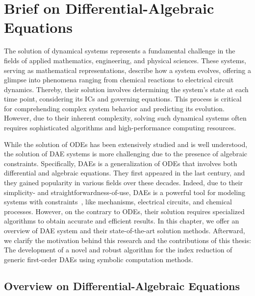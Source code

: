 
\chapter{Brief on Differential-Algebraic Equations}
\label{chap2:brief_daes}

The solution of dynamical systems represents a fundamental challenge in the fields of applied mathematics, engineering, and physical sciences. These systems, serving as mathematical representations, describe how a system evolves, offering a glimpse into phenomena ranging from chemical reactions to electrical circuit dynamics. Thereby, their solution involves determining the system's state at each time point, considering its \acp{IC} and governing equations. This process is critical for comprehending complex system behavior and predicting its evolution. However, due to their inherent complexity, solving such dynamical systems often requires sophisticated algorithms and high-performance computing resources.

While the solution of \acp{ODE} has been extensively studied and is well understood, the solution of \ac{DAE} systems is more challenging due to the presence of algebraic constraints. Specifically, \acp{DAE} is a generalization of \acp{ODE} that involves both differential and algebraic equations. They first appeared in the last century, and they gained popularity in various fields over these decades. Indeed, due to their simplicity- and straightforwardness-of-use, \acp{DAE} is a powerful tool for modeling systems with constraints~\cite{burger2018dae}, like mechanisms, electrical circuits, and chemical processes. However, on the contrary to \acp{ODE}, their solution requires specialized algorithms to obtain accurate and efficient results. In this chapter, we offer an overview of \ac{DAE} system and their state-of-the-art solution methods. Afterward, we clarify the motivation behind this research and the contributions of this thesis: The development of a novel and robust algorithm for the index reduction of generic first-order \acp{DAE} using symbolic computation methods.


\section{Overview on Differential-Algebraic Equations}

